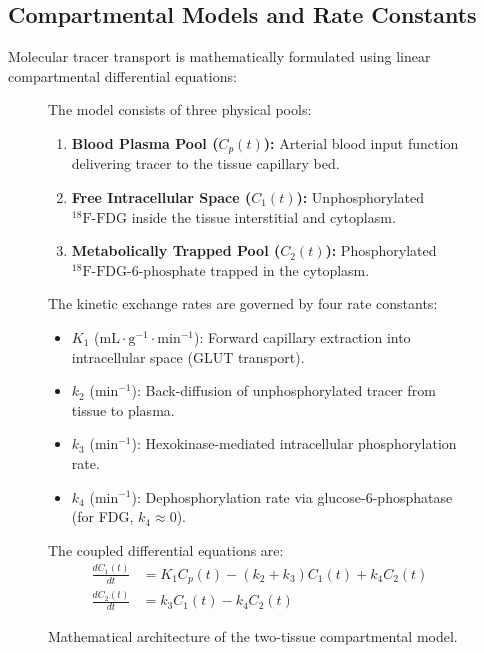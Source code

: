 \documentclass[11pt,a4paper]{article}
\begin{document}
\subsection{Compartmental Models and Rate Constants}
Molecular tracer transport is mathematically formulated using linear compartmental differential equations:
\begin{figure}[htbp]
\centering
\begin{tcolorbox}[colback=blue!5!white,colframe=blue!60!black,title=\textbf{Standard Two-Tissue Compartmental Model for $^{18}\text{F}\text{-FDG}$},width=\linewidth]
\small
The model consists of three physical pools:
\begin{enumerate}
    \item \textbf{Blood Plasma Pool ($C_p(t)$):} Arterial blood input function delivering tracer to the tissue capillary bed.
    \item \textbf{Free Intracellular Space ($C_1(t)$):} Unphosphorylated $^{18}\text{F}\text{-FDG}$ inside the tissue interstitial and cytoplasm.
    \item \textbf{Metabolically Trapped Pool ($C_2(t)$):} Phosphorylated $^{18}\text{F}\text{-FDG-6-phosphate}$ trapped in the cytoplasm.
\end{enumerate}
The kinetic exchange rates are governed by four rate constants:
\begin{itemize}
    \item $K_1$ ($\text{mL}\cdot\text{g}^{-1}\cdot\text{min}^{-1}$): Forward capillary extraction into intracellular space (GLUT transport).
    \item $k_2$ ($\text{min}^{-1}$): Back-diffusion of unphosphorylated tracer from tissue to plasma.
    \item $k_3$ ($\text{min}^{-1}$): Hexokinase-mediated intracellular phosphorylation rate.
    \item $k_4$ ($\text{min}^{-1}$): Dephosphorylation rate via glucose-6-phosphatase (for FDG, $k_4 \approx 0$).
\end{itemize}
The coupled differential equations are:
\begin{align}
    \frac{d C_1(t)}{dt} &= K_1 C_p(t) - (k_2 + k_3) C_1(t) + k_4 C_2(t) \\
    \frac{d C_2(t)}{dt} &= k_3 C_1(t) - k_4 C_2(t)
\end{align}
\end{tcolorbox}
\caption{Mathematical architecture of the two-tissue compartmental model.}
\label{fig:compartment_model}
\end{figure}
\end{document}
